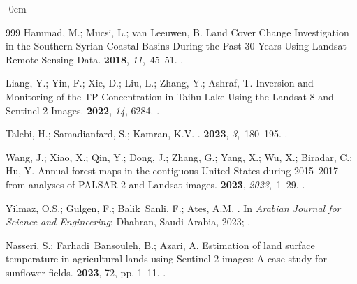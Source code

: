\documentclass[jimaging,article,accept,pdftex,moreauthors]{Definitions/mdpi}
\begin{document}
\begin{adjustwidth}{-\extralength}{0cm}
\begin{thebibliography}{999}
\clearpage
{}
Hammad, M.; Mucsi, L.; van Leeuwen, B.
\newblock Land Cover Change Investigation in the Southern Syrian Coastal Basins
  During the Past 30-Years Using Landsat Remote Sensing Data.
 {\bf 2018}, {\em
  11},~45--51.
.

Liang, Y.; Yin, F.; Xie, D.; Liu, L.; Zhang, Y.; Ashraf, T.
\newblock Inversion and Monitoring of the TP Concentration in Taihu Lake Using
  the Landsat-8 and Sentinel-2 Images.
 {\bf 2022}, {\em 14}, 6284.
.

Talebi, H.; Samadianfard, S.; Kamran, K.V.
.
 {\bf 2023}, {\em
  3},~180--195.
.

Wang, J.; Xiao, X.; Qin, Y.; Dong, J.; Zhang, G.; Yang, X.; Wu, X.; Biradar,
  C.; Hu, Y.
\newblock Annual forest maps in the contiguous United States during 2015--2017
  from analyses of PALSAR-2 and Landsat images.
 {\bf 2023}, {\em
  2023},~1--29.
.

Yilmaz, O.S.; Gulgen, F.; Balik~Sanli, F.; Ates, A.M.
.
\newblock In {\em Arabian Journal for Science and Engineering}; Dhahran, Saudi Arabia, 2023; %
.

Nasseri, S.; Farhadi~Bansouleh, B.; Azari, A.
\newblock Estimation of land surface temperature in agricultural lands using
  Sentinel 2 images: A case study for sunflower fields.
 {\bf 2023}, 72, pp. 1--11. %
.


\end{thebibliography}
\end{adjustwidth}
\end{document}

